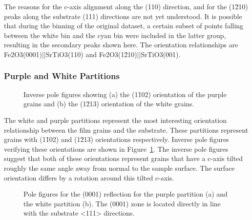 \documentclass[12pt,%
              twoside,
               letterpaper]{uiothesis}
\begin{document}
The reasons for the c-axis alignment along the (110) direction, and for the (1\={2}10)
peaks along the substrate (111) directions are not yet understood. It is possible that 
during the binning of the original dataset, a certain subset of points falling between the 
white bin and the cyan bin were included in the latter group, resulting in the secondary 
peaks shown here. The orientation relationships are Fe2O3(0001)||SrTiO3(110) and
Fe2O3(1\={2}10)||SrTiO3(001).


\subsubsection{Purple and White Partitions}
\label{subsubsec:single.growth.purplewhite}

\begin{figure}
	\begin{center}
		\caption[Inverse pole figures for purple and white grains]{%
         	Inverse pole figures showing (a) the (1\={1}02) orientation of the purple 
         	grains and (b) the (1\={2}13) orientation of the white grains.}
		\label{fig:purplewhiteipf}
	\end{center}
\end{figure}
The white and purple partitions represent the most interesting orientation relationship
between the film grains and the substrate. These partitions represent grains with
(1\={1}02) and (1\={2}13) orientations respectively. Inverse pole figures verifying these
orientations are shown in Figure~\ref{fig:purplewhiteipf}. The inverse pole figures suggest
that both of these orientations represent grains that have a c-axis tilted roughly the
same angle away from normal to the sample surface. The surface orientation differs by a
rotation around this tilted c-axis.
\begin{figure}
\begin{center}
\caption[(0001) pole figures for purple and white grains]{%
	Pole figures for the (0001) reflection for the purple partition (a) 
	and the white partition (b). The (0001) zone is located directly in 
	line with the substrate <111> directions.}
\label{fig:purplewhite0001pole}
\end{center}
\end{figure}
\end{document}
